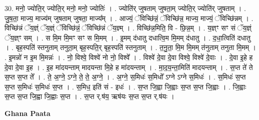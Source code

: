 \documentclass[17pt]{extarticle}
\begin{document}
30. मनो॒ ज्योति॒र् ज्योति॒र् मनो॒ मनो॒ ज्योतिः॑ । . ज्योति॑र् जुषताम् जुषता॒म् ज्योति॒र् ज्योति॑र् जुषताम् । . जु॒ष॒ता॒ माज्य॒ माज्य॑म् जुषताम् जुषता॒ माज्य᳚म् । . आज्यं॒ ॅविच्छि॑न्नं॒ ॅविच्छि॑न्न॒ माज्य॒ माज्यं॒ ॅविच्छि॑न्नम् । . विच्छि॑न्नं ॅय॒ज्ञ्ं ॅय॒ज्ञ्ं ॅविच्छि॑न्नं॒ ॅविच्छि॑न्नं ॅय॒ज्ञ्म् । . विच्छि॑न्न॒मिति॒ वि - छि॒न्न॒म् । . य॒ज्ञ्ꣳ सꣳ सं ॅय॒ज्ञ्ं ॅय॒ज्ञ्ꣳ सम् । . स मि॒म मि॒मꣳ सꣳ स मि॒मम् । . इ॒मम् द॑धातु दधात्वि॒म मि॒मम् द॑धातु । . द॒धा॒त्विति॑ दधातु । . बृह॒स्पति॑ स्तनुताम् तनुता॒म् बृह॒स्पति॒र् बृह॒स्पति॑ स्तनुताम् । . त॒नु॒ता॒ मि॒म मि॒मम् त॑नुताम् तनुता मि॒मम् । . इ॒मन्नो॑ न इ॒म मि॒मन्नः॑ । . नो॒ विश्वे॒ विश्वे॑ नो नो॒ विश्वे᳚ । . विश्वे॑ दे॒वा दे॒वा विश्वे॒ विश्वे॑ दे॒वाः । . दे॒वा इ॒हे ह दे॒वा दे॒वा इ॒ह । . इ॒ह मा॑दयन्ताम् मादयन्ता मि॒हे ह मा॑दयन्ताम् । . मा॒द॒य॒न्ता॒मिति॑ मादयन्ताम् । . स॒प्त ते॑ ते स॒प्त स॒प्त ते᳚ । . ते॒ अ॒ग्ने॒ ऽग्ने॒ ते॒ ते॒ अ॒ग्ने॒ । . अ॒ग्ने॒ स॒मिधः॑ स॒मिधो᳚ ऽग्ने ऽग्ने स॒मिधः॑ । . स॒मिधः॑ स॒प्त स॒प्त स॒मिधः॑ स॒मिधः॑ स॒प्त । . स॒मिध॒ इति॑ सं - इधः॑ । . स॒प्त जि॒ह्वा जि॒ह्वाः स॒प्त स॒प्त जि॒ह्वाः । . जि॒ह्वाः स॒प्त स॒प्त जि॒ह्वा जि॒ह्वाः स॒प्त । . स॒प्त र्.ष॑य॒ ऋष॑यः स॒प्त स॒प्त र्.ष॑यः । \newline

\textbf{Ghana Paata } \newline
\end{document}
